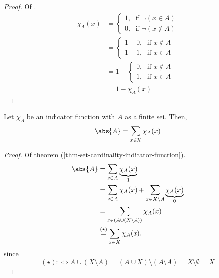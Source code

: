 \begin{proof}
	Of .
	\begin{align*}
		\chi_{\overline{A}}(x) & = \begin{cases}
			1,\;\text{ if } \neg(x \in A) \\
			0,\;\text{ if } \neg(x \notin A)
		\end{cases}    \\
		                       & = \begin{cases}
			1-0,\;\text{ if } x \notin A \\
			1-1,\;\text{ if } x \in A
		\end{cases}    \\
		                       & =1 - \begin{cases}
			0,\;\text{ if } x \notin A \\
			1,\;\text{ if } x \in A
		\end{cases} \\
		                       & = 1 - \chi_A(x)
	\end{align*}
\end{proof}

\begin{thm}\label{thm-set-cardinality-indicator-function}
	Let $\chi_A$ be an indicator function with $A$ as a finite set. Then,
	\begin{equation*}
		\abs{A} = \sum_{x \in X} \chi_A(x)
	\end{equation*}
\end{thm}

\begin{proof}
	Of theorem (\ref{thm-set-cardinality-indicator-function}).
	\begin{align*}
		\abs{A} & =\sum_{x\in A}\underbrace{\chi_A(x)}_{1}                                   \\
		        & =\sum_{x\in A}\chi_A(x)+\sum_{x\in X\setminus A}\underbrace{\chi_A(x)}_{0} \\
		        & =\sum_{x\in (A\cup (X\setminus A))}\chi_A(x)                               \\
		        & \overset{(\star)}{=}\sum_{x\in X}\chi_A(x).
	\end{align*}
	since
	\begin{equation*}
		(\star) :\Leftrightarrow A\cup(X\setminus A)=(A\cup X)\setminus(A\setminus A)=X\setminus \emptyset=X
	\end{equation*}
\end{proof}

